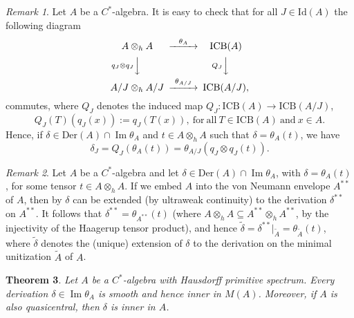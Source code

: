 \documentclass[]{amsart}
\newtheorem{theorem}{Theorem}[section]
\theoremstyle{remark}
\newtheorem{remark}[theorem]{Remark}
\theoremstyle{definition}
\theoremstyle{question}
\numberwithin{equation}{section}
\begin{document}
\begin{remark}\label{comm} Let $A$ be a $C^*$-algebra.
It is easy to check that for all $J \in \mathrm{Id}(A)$ the following diagram
$$
\begin{CD}
A \otimes_h A @> \theta_A>> \mathrm{ICB}(A)\\
@V q_J \otimes q_J VV@V Q_J VV\\
A/J \otimes_h A/J @>\theta_{A/J}>> \mathrm{ICB}(A/J),
\end{CD}
$$
commutes, where $Q_J$ denotes the induced map $Q_J : \mathrm{ICB}(A) \to
\mathrm{ICB}(A/J)$,
\begin{equation}\label{Q_J}
  Q_J(T)(q_J(x)):=q_J(T(x)), \ \mathrm{for} \ \mathrm{all} \ T\in
\mathrm{ICB}(A) \ \mathrm{and} \ x\in A.
\end{equation}
Hence, if $\delta \in \mathrm{Der}(A) \cap {\mathop{\mathrm{Im}}} \theta_A$ and $t \in A \otimes_h A$
such that $\delta=\theta_A(t)$, we have
\begin{equation}\label{D_P}
\delta_{J}=Q_J(\theta_A(t))=\theta_{A/J}(q_J \otimes q_J(t)).
\end{equation}
\end{remark}
\begin{remark}\label{pros} Let $A$ be a $C^*$-algebra and let $\delta \in \mathrm{Der}(A) \cap {\mathop{\mathrm{Im}}} \theta_A$, with $\delta=\theta_A(t)$, for
 some tensor $t \in A \otimes_h A$. If we embed $A$ into the von Neumann
envelope $A^{**}$ of $A$, then by \cite[4.2.3]{Ara} $\delta$ can be extended (by ultraweak continuity) to the derivation $\delta^{**}$ on $A^{**}$.
It follows that $\delta^{**}=\theta_{A^{**}}(t)$ (where $A \otimes_h A \subseteq A^{**}\otimes_h A^{**}$, by the injectivity of the Haagerup tensor product), and hence $\tilde{\delta}=\delta^{**}|_{\tilde{A}}=\theta_{\tilde{A}}(t)$, where $\tilde{\delta}$ denotes the (unique) extension of $\delta$ to the derivation on the minimal
unitization $\tilde{A}$ of $A$.
\end{remark}
\begin{theorem}\label{Hauss} Let $A$ be a $C^*$-algebra with Hausdorff primitive
spectrum. Every derivation $\delta \in {\mathop{\mathrm{Im}}}\theta_A$
is smooth and hence inner in $M(A)$. Moreover, if $A$ is also quasicentral, then $\delta$ is inner
in $A$.
\end{theorem}
\end{document}
